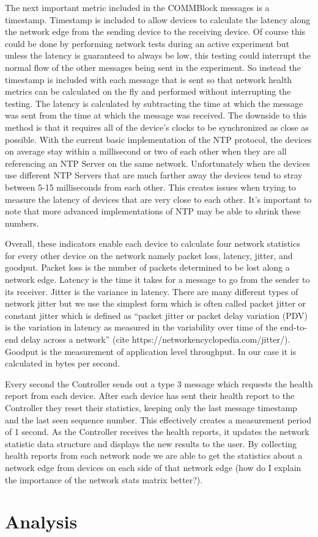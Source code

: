 \documentclass[letterpaper,twocolumn,12pt]{article}
\begin{document}
The next important metric included in the COMMBlock messages is a timestamp. Timestamp is included to allow devices to calculate the latency along the network edge from the sending device to the receiving device. Of course this could be done by performing network tests during an active experiment but unless the latency is guaranteed to always be low, this testing could interrupt the normal flow of the other messages being sent in the experiment. So instead the timestamp is included with each message that is sent so that network health metrics can be calculated on the fly and performed without interrupting the testing. The latency is calculated by subtracting the time at which the message was sent from the time at which the message was received. The downside to this method is that it requires all of the device's clocks to be synchronized as close as possible. With the current basic implementation of the NTP protocol, the devices on average stay within a millisecond or two of each other when they are all referencing an NTP Server on the same network. Unfortunately when the devices use different NTP Servers that are much farther away the devices tend to stray between 5-15 milliseconds from each other. This creates issues when trying to measure the latency of devices that are very close to each other. It's important to note that more advanced implementations of NTP may be able to shrink these numbers.

Overall, these indicators enable each device to calculate four network statistics for every other device on the network namely packet loss, latency, jitter, and goodput. Packet loss is the number of packets determined to be lost along a network edge. Latency is the time it takes for a message to go from the sender to its receiver. Jitter is the variance in latency. There are many different types of network jitter but we use the simplest form which is often called packet jitter or constant jitter which is defined as “packet jitter or packet delay variation (PDV) is the variation in latency as measured in the variability over time of the end-to-end delay across a network” (cite https://networkencyclopedia.com/jitter/). Goodput is the measurement of application level throughput. In our case it is calculated in bytes per second.

Every second the Controller sends out a type 3 message which requests the health report from each device. After each device has sent their health report to the Controller they reset their statistics, keeping only the last message timestamp and the last seen sequence number. This effectively creates a measurement period of 1 second. As the Controller receives the health reports, it updates the network statistic data structure and displays the new results to the user. By collecting health reports from each network node we are able to get the statistics about a network edge from devices on each side of that network edge (how do I explain the importance of the network stats matrix better?).


\section{Analysis}





\end{document}
